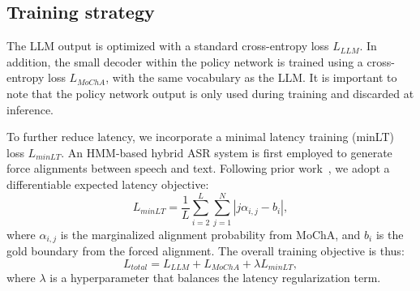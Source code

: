 \documentclass{article}
\begin{document}


\subsection{Training strategy}

The LLM output is optimized with a standard cross-entropy loss $L_{LLM}$.
In addition, the small decoder within the policy network is trained using a cross-entropy loss $L_{MoChA}$, with the same vocabulary as the LLM.
It is important to note that the policy network output is only used during training and discarded at inference.

To further reduce latency, we incorporate a minimal latency training (minLT) loss $L_{minLT}$.
An HMM-based hybrid ASR system is first employed to generate force alignments between speech and text.
Following prior work~\cite{inaguma2020minimum}, we adopt a differentiable expected latency objective:
\begin{equation}
L_{minLT} = \frac{1}{L}\sum_{i=2}^L \sum_{j=1}^N | j \alpha_{i, j} - b_i |,
\end{equation}
where $\alpha_{i,j}$ is the marginalized alignment probability from MoChA, and $b_i$ is the gold boundary from the forced alignment.
The overall training objective is thus:
\begin{equation}
L_{total} = L_{LLM} + L_{MoChA} + \lambda L_{minLT},
\end{equation}
where $\lambda$ is a hyperparameter that balances the latency regularization term.
\end{document}
